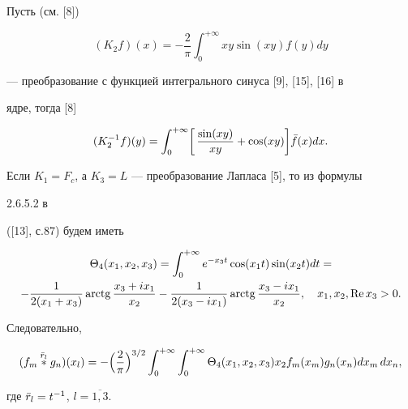 \begin{exam}


Пусть (см. [8])


$$


(K_2f)(x)=-\frac{2}{\pi}\int^{+\infty}_0


xy\sin(xy)f(y)dy


$$


--- преобразование с функцией интегрального синуса [9], [15], [16] в


ядре, тогда [8]


$$


(K^{-1}_2f)(y)=\int^{+\infty}_0


\biggl[\,\frac{\sin(xy)}{xy}+\cos(xy)\biggr]\Bar f(x)dx.


$$


Если $K_1=F_c$, а $K_3=L$ --- преобразование Лапласа [5], то из формулы


2.6.5.2 в


([13], с.87) будем иметь


\begin{multline*}


\Theta_4(x_1,x_2,x_3)=\int^{+\infty}_0 e^{-x_3t}


\cos(x_1t)\sin(x_2t)dt =\\


-\frac{1}{2(x_1+x_3)}\arctg\frac{x_3+ix_1}{x_2}-


\frac{1}{2(x_3-ix_1)}\arctg\frac{x_3-ix_1}{x_2},\quad


x_1,x_2,\re x_3 >0.


\end{multline*}


Следовательно,


$$


(f_m\up{\Bar r_l}{}g_n)(x_l)=-\Bigl(\frac{2}{\pi}\Bigr)^{3/2}


\int^{+\infty}_0 \int^{+\infty}_0 \Theta_4(x_1,x_2,x_3)


x_2f_m(x_m)g_n(x_n)dx_m\,dx_n,


$$


где $\Bar r_l=t^{-1}$, $l=\overline{1,3}$.


\end{exam}






